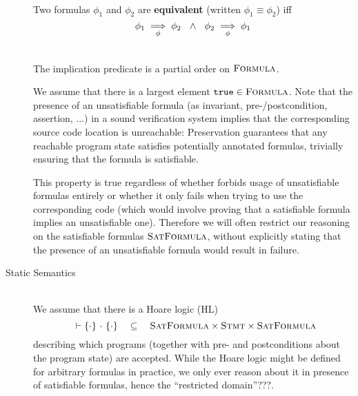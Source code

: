 \begin{description}
    \begin{definition}~\\
        Two formulas $\phi_1$ and $\phi_2$ are \textbf{equivalent} (written $\phi_1 \equiv \phi_2$) iff
        \begin{displaymath}
        {\phi_1} \underset{\phi}{\implies} {\phi_2} ~~\wedge~~ {\phi_2} \underset{\phi}{\implies} {\phi_1}
        \end{displaymath}
    \end{definition} 
    
    
    \begin{lemma}~\\
        The implication predicate is a partial order on $\textsc{Formula}$.
    \end{lemma}
    
    We assume that there is a largest element $\texttt{true} \in \textsc{Formula}$.
    Note that the presence of an unsatisfiable formula (as invariant, pre-/postcondition, assertion, ...) in a sound verification system implies that the corresponding source code location is unreachable:
    Preservation guarantees that any reachable program state satisfies potentially annotated formulas, trivially ensuring that the formula is satisfiable.
    
    This property is true regardless of whether \gsvl forbids usage of unsatisfiable formulas entirely or whether it only fails when trying to use the corresponding code (which would involve proving that a satisfiable formula implies an unsatisfiable one).
    Therefore we will often restrict our reasoning on the satisfiable formulas $\textsc{SatFormula}$, without explicitly stating that the presence of an unsatisfiable formula would result in failure.
    
\item[Static Semantics]~\\
    We assume that there is a Hoare logic (HL)
    \begin{displaymath}
    {~} \vdash \{{\cdot}\} ~{\cdot}~ \{{\cdot}\} ~~~\subseteq~~~ \textsc{SatFormula} \times \textsc{Stmt} \times \textsc{SatFormula}
    \end{displaymath}
    describing which programs (together with pre- and postconditions about the program state) are accepted.
    While the Hoare logic might be defined for arbitrary formulas in practice, we only ever reason about it in presence of satisfiable formulas, hence the “restricted domain”???.
    

\end{description}
